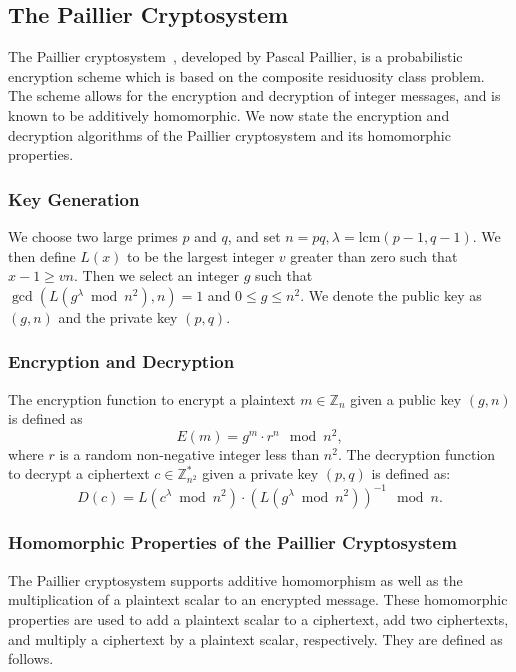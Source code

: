 \subsection{The Paillier Cryptosystem}
The Paillier cryptosystem~\cite{stern_public-key_1999}, developed by Pascal Paillier, is a probabilistic encryption scheme which is based on the composite residuosity class problem. The scheme allows for the encryption and decryption of integer messages, and is known to be additively homomorphic. We now state the encryption and decryption algorithms of the Paillier cryptosystem and its homomorphic properties.

\subsubsection{Key Generation}
We choose two large primes $p$ and $q$, and set $n = pq, \lambda = \mathrm{lcm}\left(p-1,q-1\right)$.
We then define $L\left(x\right)$ to be the largest integer $v$ greater than zero such that $x-1 \geq vn$.
Then we select an integer $g$ such that $\gcd\left(L\left(g^\lambda \bmod n^2\right), n\right) = 1$ and $0\leq g \leq n^2$.
We denote the public key as $(g,n)$ and the private key $(p,q)$.
\subsubsection{Encryption and Decryption}
The encryption function to encrypt a plaintext $m \in \mathbb{Z}_n$ given a public key $(g,n)$ is defined as
\begin{equation*}
	E\left(m\right) = g^m \cdot r^n \mod{n^2},
\end{equation*}
where $r$ is a random non-negative integer less than $n^2$.
The decryption function to decrypt a ciphertext $c \in \mathbb{Z}^*_{n^2}$ given a private key $(p,q)$ is defined as:
\begin{equation*}
	D\left(c\right) = L\left(c^\lambda \bmod n^2\right) \cdot \left(L\left(g^\lambda \bmod n^2\right)\right)^{-1} \mod n.
\end{equation*}
\subsubsection{Homomorphic Properties of the Paillier Cryptosystem}
The Paillier cryptosystem supports additive homomorphism as well as the multiplication of a plaintext scalar to an encrypted message. These homomorphic properties are used to add a plaintext scalar to a ciphertext, add two ciphertexts, and multiply a ciphertext by a plaintext scalar, respectively. They are defined as follows.

